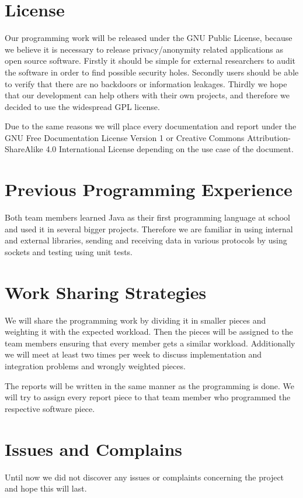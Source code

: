\documentclass{article}
\begin{document}
\section{License}
Our programming work will be released under the GNU Public License, because we
believe it is necessary to release privacy/anonymity related applications as
open source software. Firstly it should be simple for external researchers to
audit the software in order to find possible security holes. Secondly users
should be able to verify that there are no backdoors or information leakages.
Thirdly we hope that our development can help others with their own projects,
and therefore we decided to use the widespread GPL license.

Due to the same reasons we will place every documentation and report under the
GNU Free Documentation License Version 1 or Creative Commons
Attribution-ShareAlike 4.0 International License depending on the use case of
the document.

\section{Previous Programming Experience} 
Both team members learned Java as their first programming language at school and
used it in several bigger projects. Therefore we are familiar in using internal
and external libraries, sending and receiving data in various protocols by
using sockets and testing using unit tests.

\section{Work Sharing Strategies}
We will share the programming work by dividing it in smaller pieces and
weighting it with the expected workload. Then the pieces will be assigned to
the team members ensuring that every member gets a similar workload.
Additionally we will meet at least two times per week to discuss implementation
and integration problems and wrongly weighted pieces.

The reports will be written in the same manner as the programming is done. We
will try to assign every report piece to that team member who programmed the
respective software piece.

\section{Issues and Complains}
Until now we did not discover any issues or complaints concerning the project
and hope this will last.
\end{document}
